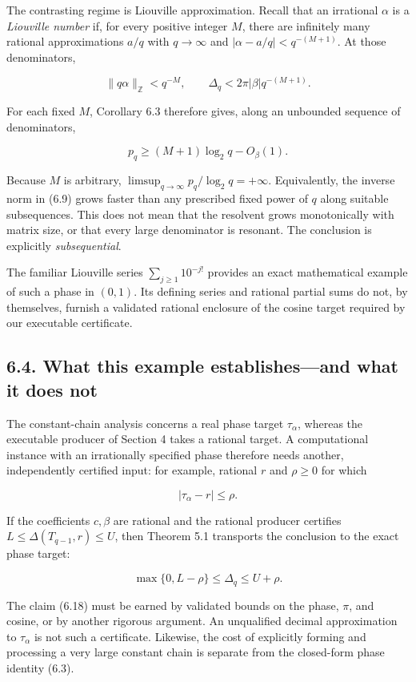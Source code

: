 \documentclass[
  11pt,
]{article}
\begin{document}
The contrasting regime is Liouville approximation. Recall that an
irrational \(\alpha\) is a \emph{Liouville number} if, for every
positive integer \(M\), there are infinitely many rational
approximations \(a/q\) with \(q\to\infty\) and
\(|\alpha-a/q|<q^{-(M+1)}\). At those denominators,

\[
\|q\alpha\|_{\mathbb Z}<q^{-M},
\qquad
\Delta_q<2\pi|\beta|q^{-(M+1)}.
\tag{6.16}
\]

For each fixed \(M\), Corollary 6.3 therefore gives, along an unbounded
sequence of denominators,

\[
p_q\ge(M+1)\log_2q-O_\beta(1).
\tag{6.17}
\]

Because \(M\) is arbitrary, \(\limsup_{q\to\infty}p_q/\log_2q=+\infty\).
Equivalently, the inverse norm in (6.9) grows faster than any prescribed
fixed power of \(q\) along suitable subsequences. This does not mean
that the resolvent grows monotonically with matrix size, or that every
large denominator is resonant. The conclusion is explicitly
\emph{subsequential}.

The familiar Liouville series \(\sum_{j\ge1}10^{-j!}\) provides an exact
mathematical example of such a phase in \((0,1)\). Its defining series
and rational partial sums do not, by themselves, furnish a validated
rational enclosure of the cosine target required by our executable
certificate.

\subsection{6.4. What this example establishes---and what it does
not}\label{what-this-example-establishesand-what-it-does-not}

The constant-chain analysis concerns a real phase target
\(\tau_\alpha\), whereas the executable producer of Section 4 takes a
rational target. A computational instance with an irrationally specified
phase therefore needs another, independently certified input: for
example, rational \(r\) and \(\rho\ge0\) for which

\[
|\tau_\alpha-r|\le\rho.
\tag{6.18}
\]

If the coefficients \(c,\beta\) are rational and the rational producer
certifies \(L\le\Delta(T_{q-1},r)\le U\), then Theorem 5.1 transports
the conclusion to the exact phase target:

\[
\max\{0,L-\rho\}
\le\Delta_q\le U+\rho.
\tag{6.19}
\]

The claim (6.18) must be earned by validated bounds on the phase,
\(\pi\), and cosine, or by another rigorous argument. An unqualified
decimal approximation to \(\tau_\alpha\) is not such a certificate.
Likewise, the cost of explicitly forming and processing a very large
constant chain is separate from the closed-form phase identity (6.3).
\end{document}
